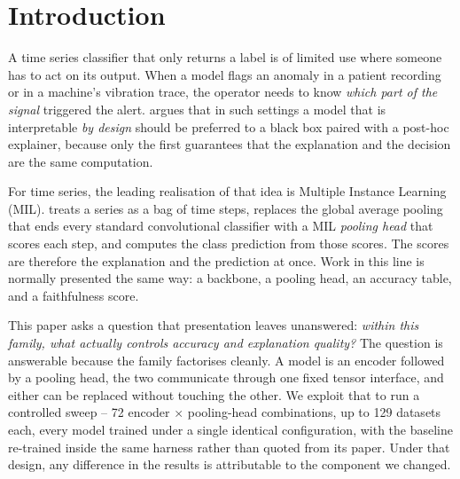 %

\section{Introduction}
\label{sec:intro}

A time series classifier that only returns a label is of limited use where someone has to act on
its output. When a model flags an anomaly in a patient recording or in a machine's vibration trace,
the operator needs to know \emph{which part of the signal} triggered the alert.
\citet{rudin2019stop} argues that in such settings a model that is interpretable \emph{by design}
should be preferred to a black box paired with a post-hoc explainer, because only the first
guarantees that the explanation and the decision are the same computation.

For time series, the leading realisation of that idea is Multiple Instance Learning (MIL). \millet{}
\citep{early2024millet} treats a series as a bag of time steps, replaces the global average pooling
that ends every standard convolutional classifier \citep{wang2017fcn, fawaz2020inceptiontime} with a
MIL \emph{pooling head} that scores each step, and computes the class prediction from those scores.
The scores are therefore the explanation and the prediction at once. Work in this line is normally
presented the same way: a backbone, a pooling head, an accuracy table, and a faithfulness score.

This paper asks a question that presentation leaves unanswered: \emph{within this family, what
actually controls accuracy and explanation quality?} The question is answerable because the family
factorises cleanly. A model is an encoder followed by a pooling head, the two communicate through
one fixed tensor interface, and either can be replaced without touching the other. We exploit that
to run a controlled sweep -- 72 encoder $\times$ pooling-head combinations, up to 129 datasets each,
every model trained under a single identical configuration, with the \millet{} baseline re-trained
inside the same harness rather than quoted from its paper. Under that design, any difference in the
results is attributable to the component we changed.

